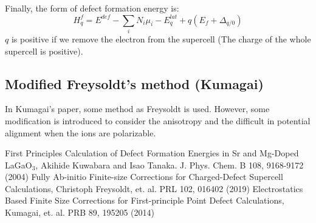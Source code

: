 \documentclass{article}
\begin{document}
Finally, the form of defect formation energy is:
\begin{equation}
    H^{f}_q = E^{def} - \sum_i N_i \mu_i - E^{lat}_q + q(E_f + \Delta_{q/0})
\end{equation}
$q$ is positive if we remove the electron from the supercell (The charge of the whole supercell is positive).

\subsection*{Modified Freysoldt's method (Kumagai)}
In Kumagai's paper, some method as Freysoldt is used. However, some modification is introduced 
to consider the anisotropy and the difficult in potential alignment when the ions are polarizable.


\begin{thebibliography}{99}
        First Principles Calculation of Defect Formation Energies in Sr and Mg-Doped LaGaO$_3$, Akihide Kuwabara and Isao Tanaka. J. Phys. Chem. B 108, 9168-9172 (2004)
        Fully Ab-initio Finite-size Corrections for Charged-Defect Supercell Calculations, Christoph Freysoldt, et. al. PRL 102, 016402 (2019)
        Electrostatics Based Finite Size Corrections for First-principle Point Defect Calculations, Kumagai, et. al. PRB 89, 195205 (2014) 
\end{thebibliography}
\end{document}
